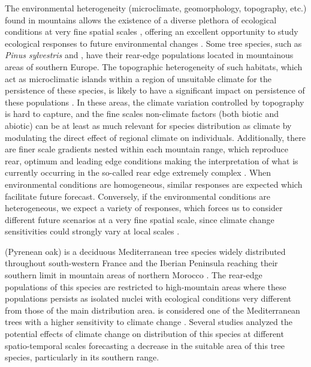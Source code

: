 The environmental heterogeneity (microclimate, geomorphology, topography, etc.) found in mountains allows the existence of a diverse plethora of ecological conditions at very fine spatial scales \autocite{Hannahetal2014FinegrainModeling,KornerSpehn2019HumboldtianView}, offering an excellent opportunity to study ecological responses to future environmental changes \autocite{SpehnKorner2009MountainLaboratory,Kohleretal2014MountainsClimate,Payneetal2017OpportunitiesResearch,Zamoraetal2017GlobalChange}. Some tree species, such as \emph{Pinus sylvestris} and \Qpy, have their rear-edge populations located in mountainous areas of southern Europe. The topographic heterogeneity of such habitats, which act as microclimatic islands within a region of unsuitable climate for the persistence of these species, is likely to have a significant impact on persistence of these populations \autocite{MeineriHylander2017FinegrainLargedomain}. In these areas, the climate variation controlled by topography \autocite{Franklinetal2013ModelingPlant,Potteretal2013MicroclimaticChallenges} is hard to capture, and the fine scales non-climate factors (both biotic and abiotic) can be at least as much relevant for species distribution as climate \autocite{Loetal2010WordCaution} by modulating the direct effect of regional climate on individuals. Additionally, there are finer scale gradients nested within each mountain range, which reproduce rear, optimum and leading edge conditions making the interpretation of what is currently occurring in the so-called rear edge extremely complex \autocite{Benavidesetal2013DirectIndirect,Oldfatheretal2020RangeEdges}. When environmental conditions are homogeneous, similar responses are expected which facilitate future forecast. Conversely, if the environmental conditions are heterogeneous, we expect a variety of responses, which forces us to consider different future scenarios at a very fine spatial scale, since climate change sensitivities could strongly vary at local scales \autocite{Lindneretal2010ClimateChange,GeaIzquierdoCanellas2014LocalClimate,Titoetal2020MountainEcosystems}.

\Qpw (Pyrenean oak) is a deciduous Mediterranean tree species widely distributed throughout south-western France and the Iberian Peninsula reaching their southern limit in mountain areas of northern Morocco \autocite{Franco1990Quercus}. The rear-edge populations of this species are restricted to high-mountain areas where these populations persists as isolated nuclei with ecological conditions very different from those of the main distribution area. \Qp is considered one of the Mediterranean trees with a higher sensitivity to climate change \autocite{BenitoGarzonetal2008EffectsClimate,GarciaValdesetal2013ChasingMoving}. Several studies analyzed the potential effects of climate change on distribution of this species at different spatio-temporal scales \autocite{Benitoetal2011SimulatingPotential,BenitoGarzonetal2008EffectsClimate,BenitoGarzonetal2007PredictiveModelling,Felicisimo2011ImpactosVulnerabilidad,GeaIzquierdoetal2013GrowthProjections,RuizBenitoetal2013PatternsDrivers,RuizLabourdetteetal2013ChangesTree,Urbietaetal2011MediterraneanPine} forecasting a decrease in the suitable area of this tree species, particularly in its southern range.

